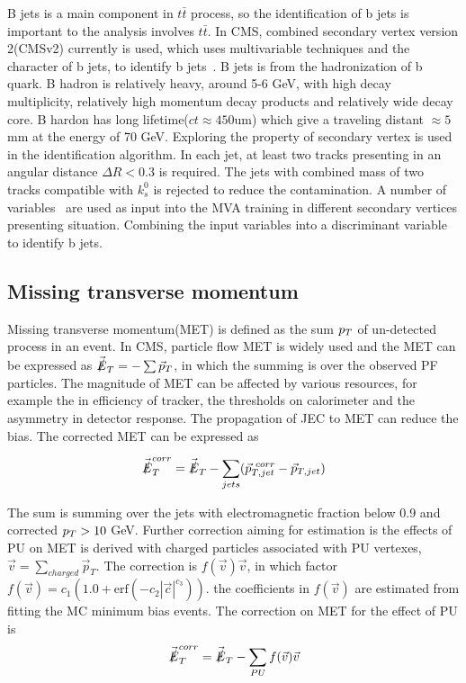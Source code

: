 B jets is a main component in $t\bar{t}$ process, so the identification of b jets is important to the analysis involves $t\bar{t}$. In CMS, combined secondary vertex version 2(CMSv2) currently is used, which uses multivariable techniques and the character of b jets, to identify b jets~\cite{BTV-16-002}. B jets is from the hadronization of b quark. B hadron is relatively heavy, around 5-6 GeV, with high decay multiplicity, relatively high momentum decay products and relatively wide decay core. B hardon has long lifetime($ct\approx450$um) which give a traveling distant $\approx5$ mm at the energy of 70 GeV. Exploring the property of secondary vertex is used in the identification algorithm. In each jet, at least two tracks presenting in an angular distance $\Delta R <0.3$ is required. The jets with combined mass of two tracks compatible with $k_{s}^{0}$ is rejected to reduce the contamination. A number of variables~\cite{BTV-16-002} are used as input into the MVA training in different secondary vertices presenting situation. Combining the input variables into a discriminant variable to identify b jets.



\subsection{Missing transverse momentum}
Missing transverse momentum(MET) is defined as the sum $p_{T}$ of un-detected process in an event. In CMS, particle flow MET is widely used and the MET can be expressed as $\vec{\slashed{E}}_{T}=-\sum \vec{p}_{T}$, in which the summing is over the observed PF particles.  The magnitude of MET can be affected by various resources, for example the in efficiency of tracker, the thresholds on calorimeter and the asymmetry in detector response. The propagation of JEC to MET can reduce the bias. The corrected MET can be expressed as
  
\begin{align*}
\vec{\slashed{E}}_{T}^{corr}=\vec{\slashed{E}}_{T}-\sum_{jets}(\vec{p}_{T,jet}^{~corr}-\vec{p}_{T,jet})
\end{align*}

The sum is summing over the jets with electromagnetic fraction below 0.9 and corrected $p_{T}>10$ GeV. Further correction aiming for estimation is the effects of PU on MET is derived with charged particles associated with PU vertexes, $\vec{v}=\sum_{charged}\vec{p}_{T}$. The correction is $f(\vec{v})\vec{v}$, in which factor $f(\vec{v})=c_{1}(1.0+\textrm{erf}(-c_{2}|\vec{c}|^{c_{3}}))$. the coefficients in $f(\vec{v})$ are estimated from fitting the MC minimum bias events. The correction on MET for the effect of PU is 
\begin{align*}
\vec{\slashed{E}}_{T}^{corr}=\vec{\slashed{E}}_{T}-\sum_{PU}f(\vec{v})\vec{v}
\end{align*}

